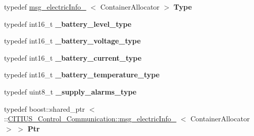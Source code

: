 \begin{DoxyCompactItemize}
\item 
\hypertarget{struct_c_i_t_i_u_s___control___communication_1_1msg__electric_info___ad91ed35c8f16f565006bd2352fd184b0}{typedef \hyperlink{struct_c_i_t_i_u_s___control___communication_1_1msg__electric_info__}{msg\-\_\-electric\-Info\-\_\-}\*
$<$ \-Container\-Allocator $>$ {\bfseries \-Type}}\label{struct_c_i_t_i_u_s___control___communication_1_1msg__electric_info___ad91ed35c8f16f565006bd2352fd184b0}

\item 
\hypertarget{struct_c_i_t_i_u_s___control___communication_1_1msg__electric_info___a93eeb203d12c6d6b96f3b8301b357471}{typedef int16\-\_\-t {\bfseries \-\_\-battery\-\_\-level\-\_\-type}}\label{struct_c_i_t_i_u_s___control___communication_1_1msg__electric_info___a93eeb203d12c6d6b96f3b8301b357471}

\item 
\hypertarget{struct_c_i_t_i_u_s___control___communication_1_1msg__electric_info___a65b7076c645802438dfdcb3012b6d55c}{typedef int16\-\_\-t {\bfseries \-\_\-battery\-\_\-voltage\-\_\-type}}\label{struct_c_i_t_i_u_s___control___communication_1_1msg__electric_info___a65b7076c645802438dfdcb3012b6d55c}

\item 
\hypertarget{struct_c_i_t_i_u_s___control___communication_1_1msg__electric_info___aa7fefb4bca02123f8bb2336584b4725b}{typedef int16\-\_\-t {\bfseries \-\_\-battery\-\_\-current\-\_\-type}}\label{struct_c_i_t_i_u_s___control___communication_1_1msg__electric_info___aa7fefb4bca02123f8bb2336584b4725b}

\item 
\hypertarget{struct_c_i_t_i_u_s___control___communication_1_1msg__electric_info___a2f89fc338b826b77b4e56f0237fd0153}{typedef int16\-\_\-t {\bfseries \-\_\-battery\-\_\-temperature\-\_\-type}}\label{struct_c_i_t_i_u_s___control___communication_1_1msg__electric_info___a2f89fc338b826b77b4e56f0237fd0153}

\item 
\hypertarget{struct_c_i_t_i_u_s___control___communication_1_1msg__electric_info___a0925a39c2a5b1553a29d8416b8b7c8b6}{typedef uint8\-\_\-t {\bfseries \-\_\-supply\-\_\-alarms\-\_\-type}}\label{struct_c_i_t_i_u_s___control___communication_1_1msg__electric_info___a0925a39c2a5b1553a29d8416b8b7c8b6}

\item 
\hypertarget{struct_c_i_t_i_u_s___control___communication_1_1msg__electric_info___ad5dcbf4d5a54564439d41450d7dcaed7}{typedef boost\-::shared\-\_\-ptr\*
$<$ \-::\hyperlink{struct_c_i_t_i_u_s___control___communication_1_1msg__electric_info__}{\-C\-I\-T\-I\-U\-S\-\_\-\-Control\-\_\-\-Communication\-::msg\-\_\-electric\-Info\-\_\-}\*
$<$ \-Container\-Allocator $>$ $>$ {\bfseries \-Ptr}}\label{struct_c_i_t_i_u_s___control___communication_1_1msg__electric_info___ad5dcbf4d5a54564439d41450d7dcaed7}


\end{DoxyCompactItemize}
